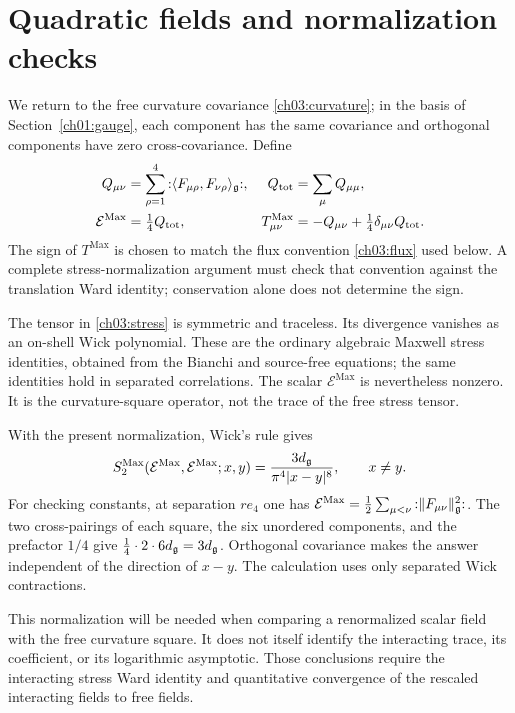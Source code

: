 \section{Quadratic fields and normalization checks}\label{ch03:quadratic}

We return to the free curvature covariance
\eqref{ch03:curvature}; in the basis of Section~\ref{ch01:gauge}, each component has the same
covariance and orthogonal components have zero cross-covariance. Define
\begin{align}
 Q_{\mu\nu}
 &=\sum_{\rho=1}^4
       {:}\langle F_{\mu\rho},F_{\nu\rho}\rangle_{\mathfrak g}{:},
 & Q_{\mathrm{tot}}&=\sum_\mu Q_{\mu\mu},\label{ch03:quadratics}\\
 \mathcal E^{\mathrm{Max}}&=\tfrac14 Q_{\mathrm{tot}},
 &T^{\mathrm{Max}}_{\mu\nu}
   &=-Q_{\mu\nu}+\tfrac14\delta_{\mu\nu}Q_{\mathrm{tot}}.
 \label{ch03:stress}
\end{align}
The sign of $T^{\mathrm{Max}}$ is chosen to match the flux
convention \eqref{ch03:flux} used below. A complete stress-normalization
argument must check that convention against the translation Ward identity;
conservation alone does not determine the sign.

The tensor in \eqref{ch03:stress} is symmetric and traceless. Its
divergence vanishes as an on-shell Wick polynomial. These are the
ordinary algebraic Maxwell stress identities, obtained from the Bianchi
and source-free equations; the same identities hold in separated
correlations. The scalar $\mathcal E^{\mathrm{Max}}$ is nevertheless
nonzero. It is the curvature-square operator, not the trace of the free
stress tensor.

With the present normalization, Wick's rule gives
\begin{equation}\label{ch03:scalar-pair}
 S_2^{\mathrm{Max}}(\mathcal E^{\mathrm{Max}},
                    \mathcal E^{\mathrm{Max}};x,y)
 =\frac{3d_{\mathfrak g}}{\pi^4|x-y|^8},\qquad x\ne y.
\end{equation}
For checking constants, at separation $re_4$ one has
$\mathcal E^{\mathrm{Max}}=\tfrac12\sum_{\mu<\nu}{:}\|F_{\mu\nu}\|_{\mathfrak g}^2{:}$. The two cross-pairings of each square,
the six unordered components, and the prefactor $1/4$ give
$\tfrac14\cdot2\cdot6d_{\mathfrak g}=3d_{\mathfrak g}$.
Orthogonal covariance makes the answer independent of the direction of
$x-y$. The calculation uses only separated Wick contractions.

This normalization will be needed when comparing a renormalized scalar
field with the free curvature square. It does not itself identify the
interacting trace, its coefficient, or its logarithmic asymptotic.
Those conclusions require the interacting stress Ward identity and
quantitative convergence of the rescaled interacting fields to free fields.

